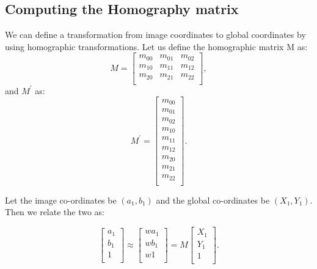 \documentclass[conf]{new-aiaa}
\begin{document}
\subsection{Computing the Homography matrix}
We can define a transformation from image coordinates to global coordinates by using homographic transformations. Let us define the homographic matrix M as:
$$
M=
\begin{bmatrix}
m_{00} & m_{01} & m_{02}\\
m_{10} & m_{11} & m_{12}\\
m_{20} & m_{21} & m_{22}\\
\end{bmatrix},
$$
and $M^{'}$ as:
$$
M^{'}=
\begin{bmatrix}
m_{00}\\
m_{01}\\
m_{02}\\
m_{10}\\
m_{11}\\
m_{12}\\
m_{20}\\
m_{21}\\
m_{22}\\
\end{bmatrix}.
$$

Let the image co-ordinates be $(a_{1},b_{1})$ and the global co-ordinates be $(X_{1},Y_{1})$. Then we relate the two as:

$$
\begin{bmatrix}
a_{1}\\
b_{1}\\
1\\
\end{bmatrix}
\approx
\begin{bmatrix}
wa_{1}\\
wb_{1}\\
w1\\
\end{bmatrix}
=
M
\begin{bmatrix}
X_{1}\\
Y_{1}\\
1\\
\end{bmatrix}.
$$
\end{document}
